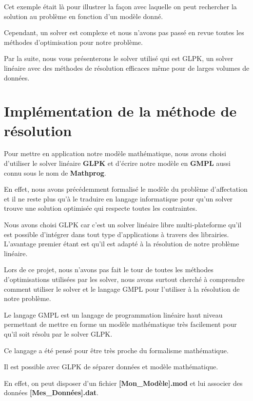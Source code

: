 \documentclass[final,poster]{polytech/polytech}
\begin{document}
Cet exemple était là pour illustrer la façon avec laquelle on peut rechercher la solution au problème en fonction d'un modèle donné.

Cependant, un solver est complexe et nous n'avons pas passé en revue toutes les méthodes d'optimisation pour notre problème.

Par la suite, nous vous présenterons le solver utilisé qui est GLPK, un solver linéaire avec des méthodes de résolution efficaces même pour de larges volumes de données.

\section{Implémentation de la méthode de résolution}

Pour mettre en application notre modèle mathématique, nous avons choisi d'utiliser le solver linéaire \textbf{GLPK} et d'écrire notre modèle en \textbf{GMPL} aussi connu sous le nom de \textbf{Mathprog}.

En effet, nous avons précédemment formalisé le modèle du problème d'affectation et il ne reste plus qu'à le traduire en langage informatique pour qu'un solver trouve une solution optimisée qui respecte toutes les contraintes.

Nous avons choisi GLPK car c'est un solver linéaire libre multi-plateforme qu'il est possible d'intégrer dans tout type d'applications à travers des librairies. L'avantage premier étant est qu'il est adapté à la résolution de notre problème linéaire.

Lors de ce projet, nous n'avons pas fait le tour de toutes les méthodes d'optimisations utilisées par les solver, nous avons surtout cherché à comprendre comment utiliser le solver et le langage GMPL pour l'utiliser à la résolution de notre problème.
 
Le langage GMPL est un langage de programmation linéaire haut niveau permettant de mettre en forme un modèle mathématique très facilement pour qu'il soit résolu par le solver GLPK.

Ce langage a été pensé pour être très proche du formalisme mathématique.

Il est possible avec GLPK de séparer données et modèle mathématique. 

En effet, on peut disposer d'un fichier \textbf{[Mon\_Modèle].mod} et lui associer des données \textbf{[Mes\_Données].dat}.
\end{document}
